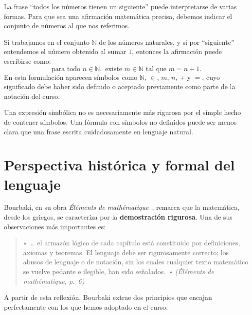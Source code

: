 \begin{ejemplo}
La frase ``todos los números tienen un siguiente'' puede interpretarse de varias formas. Para que sea una afirmación matemática precisa, debemos indicar el conjunto de números al que nos referimos.

Si trabajamos en el conjunto \(\mathbb{N}\) de los números naturales, y si por ``siguiente'' entendemos el número obtenido al sumar \(1\), entonces la afirmación puede escribirse como:
\[
  \text{para todo } n\in \mathbb{N}, \text{ existe } m\in \mathbb{N} \text{ tal que } m=n+1.
\]
En esta formulación aparecen símbolos como \(\mathbb{N}\), \(\in\), \(m\), \(n\), \(+\) y \(=\), cuyo significado debe haber sido definido o aceptado previamente como parte de la notación del curso.
\end{ejemplo}

\begin{advertencia}
Una expresión simbólica no es necesariamente más rigurosa por el simple hecho de contener símbolos. Una fórmula con símbolos no definidos puede ser menos clara que una frase escrita cuidadosamente en lenguaje natural.
\end{advertencia}


\section{Perspectiva histórica y formal del lenguaje}
\label{sec:perspectiva-bourbaki}

Bourbaki, en su obra \emph{Éléments de mathématique}~\cite{bourbaki1970},
remarca que la matemática, desde los griegos, se caracteriza por la
\textbf{demostración rigurosa}.  Una de sus observaciones más importantes es:

\begin{quote}
  « … el armazón lógico de cada capítulo está constituido por definiciones,
  axiomas y teoremas.  El lenguaje debe ser rigurosamente correcto;
  los abusos de lenguaje o de notación, sin los cuales cualquier texto
  matemático se vuelve pedante e ilegible, han sido señalados. »
  \hfill \textit{(Éléments de mathématique, p.~6)}
\end{quote}

A partir de esta reflexión, Bourbaki extrae dos principios que encajan
perfectamente con los que hemos adoptado en el curso:

